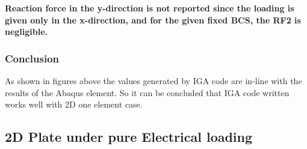 \documentclass[11pt]{article}
\begin{document}
\textbf{Reaction force in the y-direction is not reported since the loading is given only in the x-direction, and for the given fixed BCS, the RF2 is negligible.}  \\

\subsubsection{Conclusion}
As shown in figures above the values generated by IGA code are in-line with the results of the Abaqus element. So it can be concluded that IGA code written works well with 2D one element case.






\subsection{2D Plate under pure Electrical loading}
\end{document}
